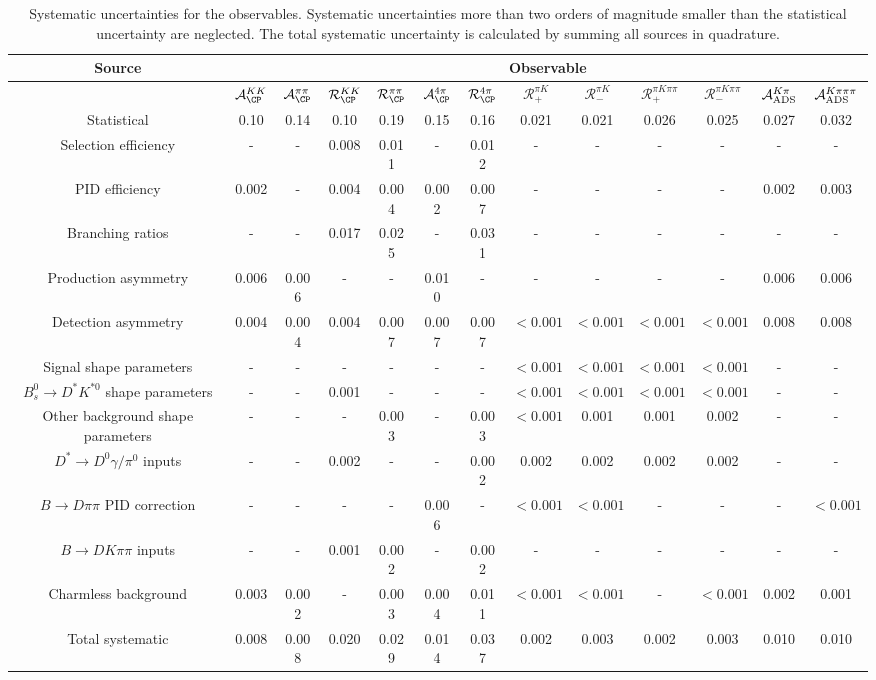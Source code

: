 \begin{sidewaystable}
  \centering
  \caption{Systematic uncertainties for the observables. Systematic uncertainties more than two orders of magnitude smaller than the statistical uncertainty are neglected. The total systematic uncertainty is calculated by summing all sources in quadrature.}
  \begin{tabular}{ccccccccccccc}
      \toprule
      Source & \multicolumn{12}{c}{Observable} \\
      \midrule
       & $\mathcal{A}_{\CP}^{KK}$ & $\mathcal{A}_{\CP}^{\pi\pi}$ & $\mathcal{R}_{\CP}^{KK}$ & $\mathcal{R}_{\CP}^{\pi\pi}$ & $\mathcal{A}_{\CP}^{4\pi}$ & $\mathcal{R}_{\CP}^{4\pi}$ & $\mathcal{R}_+^{\pi K}$ & $\mathcal{R}_-^{\pi K}$ & $\mathcal{R}_+^{\pi K\pi\pi}$ & $\mathcal{R}_-^{\pi K\pi\pi}$ & $\mathcal{A}_{\rm ADS}^{K\pi}$ & $\mathcal{A}_{\rm ADS}^{K\pi\pi\pi}$ \\
      \midrule
      Statistical & 0.10 & 0.14 & 0.10 & 0.19 & 0.15 & 0.16 & 0.021 & 0.021 & 0.026 & 0.025 & 0.027 & 0.032 \\
      \midrule
      Selection efficiency & -  & -  & 0.008 & 0.011 & -  & 0.012 & -  & -  & -  & -  & -  & -  \\
      PID efficiency & 0.002 & -  & 0.004 & 0.004 & 0.002 & 0.007 & -  & -  & -  & -  & 0.002 & 0.003 \\
      Branching ratios & -  & -  & 0.017 & 0.025 & -  & 0.031 & -  & -  & -  & -  & -  & -  \\
      Production asymmetry & 0.006 & 0.006 & -  & -  & 0.010 & -  & -  & -  & -  & -  & 0.006 & 0.006 \\
      Detection asymmetry & 0.004 & 0.004 & 0.004 & 0.007 & 0.007 & 0.007 & $<0.001$ & $<0.001$ & $<0.001$ & $<0.001$ & 0.008 & 0.008 \\
      Signal shape parameters & -  & -  & -  & -  & -  & -  & $<0.001$ & $<0.001$ & $<0.001$ & $<0.001$ & -  & -  \\
      $B^0_s \to D^* K^{*0}$ shape parameters & -  & -  & 0.001 & -  & -  & -  & $<0.001$ & $<0.001$ & $<0.001$ & $<0.001$ & -  & -  \\
      Other background shape parameters & -  & -  & -  & 0.003 & -  & 0.003 & $<0.001$ & 0.001 & 0.001 & 0.002 & -  & -  \\
      $D^* \to D^0 \gamma/\pi^0$ inputs & -  & -  & 0.002 & -  & -  & 0.002 & 0.002 & 0.002 & 0.002 & 0.002 & -  & -  \\
      $B\to D\pi\pi$ PID correction & -  & -  & -  & -  & 0.006 & -  & $<0.001$ & $<0.001$ & -  & -  & -  & $<0.001$ \\
      $B\to DK\pi\pi$ inputs & -  & -  & 0.001 & 0.002 & -  & 0.002 & -  & -  & -  & -  & -  & -  \\
      Charmless background & 0.003 & 0.002 & -  & 0.003 & 0.004 & 0.011 & $<0.001$ & $<0.001$ & -  & $<0.001$ & 0.002 & 0.001 \\
      \midrule
      Total systematic & 0.008 & 0.008 & 0.020 & 0.029 & 0.014 & 0.037 & 0.002 & 0.003 & 0.002 & 0.003 & 0.010 & 0.010 \\
      \bottomrule
  \end{tabular}
\label{tab:systematics}
\end{sidewaystable}
